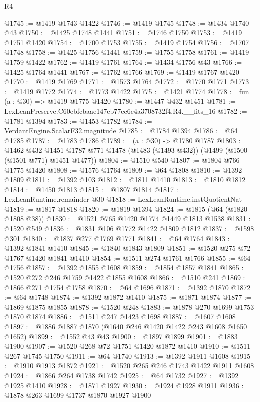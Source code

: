 \begin{lexlean}{R4}
\begin{coremodule}
@1745 := @1419 @1743 @1422
@1746 := @1419 @1745
@1748 := @1434 @1740 @43
@1750 := @1425 @1748 @1441
@1751 := @1746 @1750
@1753 := @1419 @1751 @1420
@1754 := @1700 @1753
@1755 := @1419 @1754
@1756 := @1707 @1748
@1758 := @1425 @1756 @1441
@1759 := @1755 @1758
@1761 := @1419 @1759 @1422
@1762 := @1419 @1761
@1764 := @1434 @1756 @43
@1766 := @1425 @1764 @1441
@1767 := @1762 @1766
@1769 := @1419 @1767 @1420
@1770 := @1419 @1769
@1771 := @1573 @1764
@1772 := @1770 @1771
@1773 := @1419 @1772
@1774 := @1773 @1422
@1775 := @1421 @1774
@1778 := fun (a : @30) => @1419 @1775 @1420
@1780 := @1447 @432 @1451
@1781 := LexLeanPreserve.C60ebfcbaae147eb77ec6e4a3708732f4.R4.__fits_16
@1782 := @1781 @1394
@1783 := @1453 @1782
@1784 := VerdantEngine.ScalarF32.magnitude
@1785 := @1784 @1394
@1786 := @64 @1785
@1787 := @1783 @1786
@1789 := (a : @30) -> @1780 @1787
@1803 := @1462
    @432
    @1451
    @1787
    @771
    @1478
    (@1483 (@1493 @432))
    (@1499 (@1500 (@1501 @771) @1451 @1477))
@1804 := @1510 @540
@1807 := @1804 @766 @1775 @1420
@1808 := @1576 @1764
@1809 := @64 @1808
@1810 := @1392 @1809
@1811 := @1392 @103
@1812 := @1811 @1410
@1813 := @1810 @1812
@1814 := @1450 @1813
@1815 := @1807 @1814
@1817 := LexLeanRuntime.remainder @30
@1818 := LexLeanRuntime.instQuotientNat
@1819 := @1817 @1818
@1820 := @1819 @1394
@1824 := @1815 (@64 (@1820 @1808 @38))
@1830 := @1521 @765 @1420 @1774 @1449 @1813 @1538
@1831 := @1520 @549
@1836 := @1831 @106 @1772 @1422 @1809 @1812
@1837 := @1598 @301
@1840 := @1837 @277 @1769 @1771
@1841 := @64 @1764
@1843 := @1392 @1841 @1410
@1845 := @1840 @1843 @1809
@1851 := @1520 @275 @72 @1767 @1420 @1841 @1410
@1854 := @1511 @274 @1761 @1766
@1855 := @64 @1756
@1857 := @1392 @1855 @1608
@1859 := @1854 @1857 @1841
@1865 := @1520 @272 @246 @1759 @1422 @1855 @1608
@1866 := @1510 @241
@1869 := @1866 @271 @1754 @1758
@1870 := @64 @1696
@1871 := @1392 @1870
@1872 := @64 @1748
@1874 := @1392 @1872 @1410
@1875 := @1871 @1874
@1877 := @1869 @1875 @1855
@1878 := @1520 @248
@1883 := @1878 @270 @1699 @1753 @1870 @1874
@1886 := @1511 @247 @1423 @1698
@1887 := @1607 @1608
@1897 := @1886 @1887 @1870 (@1640 @246 @1420 @1422 @243 @1608 @1650 @1652)
@1899 := @1552 @43 @43
@1900 := @1897 @1899
@1901 := @1883 @1900
@1907 := @1520 @268 @72 @1751 @1420 @1872 @1410
@1910 := @1511 @267 @1745 @1750
@1911 := @64 @1740
@1913 := @1392 @1911 @1608
@1915 := @1910 @1913 @1872
@1921 := @1520 @265 @246 @1743 @1422 @1911 @1608
@1924 := @1866 @264 @1738 @1742
@1925 := @64 @1732
@1927 := @1392 @1925 @1410
@1928 := @1871 @1927
@1930 := @1924 @1928 @1911
@1936 := @1878 @263 @1699 @1737 @1870 @1927 @1900

\end{coremodule}
\end{lexlean}
